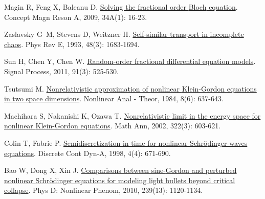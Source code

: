 \begin{thebibliography}{79}
    Magin R, Feng X, Baleanu D.
    \newblock \href{https://onlinelibrary.wiley.com/doi/10.1002/cmr.a.20129}{Solving the fractional order {{Bloch}} equation}\allowbreak[J].
    \newblock Concept Magn Reson A, 2009, 34A\allowbreak (1): 16-23.
    
    Zaslavsky G~M, Stevens D, Weitzner H.
    \newblock \href{https://link.aps.org/doi/10.1103/PhysRevE.48.1683}{Self-similar transport in incomplete chaos}\allowbreak[J].
    \newblock Phys Rev E, 1993, 48\allowbreak (3): 1683-1694.
    
    Sun H, Chen Y, Chen W.
    \newblock \href{https://linkinghub.elsevier.com/retrieve/pii/S0165168410000447}{Random-order fractional differential equation models}\allowbreak[J].
    \newblock Signal Process, 2011, 91\allowbreak (3): 525-530.
    
    Tsutsumi M.
    \newblock \href{https://www.sciencedirect.com/science/article/pii/0362546X84900087}{Nonrelativistic approximation of nonlinear {{Klein-Gordon}} equations in two space dimensions}\allowbreak[J].
    \newblock Nonlinear Anal - Theor, 1984, 8\allowbreak (6): 637-643.

    Machihara S, Nakanishi K, Ozawa T.
    \newblock \href{http://link.springer.com/10.1007/s002080200008}{Nonrelativistic limit in the energy space for nonlinear {{Klein-Gordon}} equations}\allowbreak[J].
    \newblock Math Ann, 2002, 322\allowbreak (3): 603-621.
    
    Colin T, Fabrie P.
    \newblock \href{https://www.aimsciences.org/en/article/doi/10.3934/dcds.1998.4.671}{Semidiscretization in time for nonlinear {{Schr{\"o}dinger-waves}} equations}\allowbreak[J].
    \newblock Discrete Cont Dyn-A, 1998, 4\allowbreak (4): 671-690.
    
    Bao W, Dong X, Xin J.
    \newblock \href{https://linkinghub.elsevier.com/retrieve/pii/S0167278910000965}{Comparisons between sine-{{Gordon}} and perturbed nonlinear {{Schr{\"o}dinger}} equations for modeling light bullets beyond critical collapse}\allowbreak[J].
    \newblock Phys D: Nonlinear Phenom, 2010, 239\allowbreak (13): 1120-1134.
    

\end{thebibliography}
